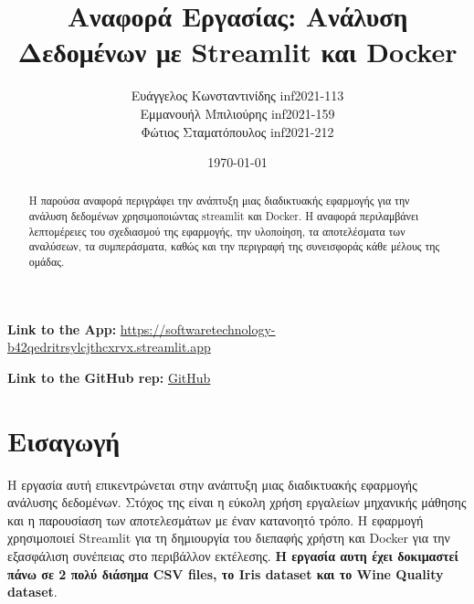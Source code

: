 \documentclass[a4paper,12pt]{article}
\title{Αναφορά Εργασίας: Ανάλυση Δεδομένων με \textlatin{Streamlit} και \textlatin{Docker}}
\author{Ευάγγελος Κωνσταντινίδης \textlatin{inf2021-113} \\
        Εμμανουήλ Μπιλιούρης \textlatin{inf2021-159} \\
        Φώτιος Σταματόπουλος \textlatin{inf2021-212}}
\date{\today}
\begin{document}

\maketitle

\begin{center}
    \textbf{\textlatin{Link to the App}:} \href{https://softwaretechnology-b42qedritrsylcjthcxrvx.streamlit.app}{\textlatin{https://softwaretechnology-b42qedritrsylcjthcxrvx.streamlit.app}}
\end{center}

\begin{center}
    \textbf{\textlatin{Link to the GitHub rep}:} \href{https://github.com/ManosBiliouris/Texnologia_Logismikou}{\textlatin{GitHub}}
\end{center}

\begin{abstract}
Η παρούσα αναφορά περιγράφει την ανάπτυξη μιας διαδικτυακής εφαρμογής για την ανάλυση δεδομένων χρησιμοποιώντας \textlatin{streamlit} και \textlatin{Docker}. Η αναφορά περιλαμβάνει λεπτομέρειες του σχεδιασμού της εφαρμογής, την υλοποίηση, τα αποτελέσματα των αναλύσεων, τα συμπεράσματα, καθώς και την περιγραφή της συνεισφοράς κάθε μέλους της ομάδας.
\end{abstract}

\tableofcontents
\newpage

\section{Εισαγωγή}
\label{sec:intro}
Η εργασία αυτή επικεντρώνεται στην ανάπτυξη μιας διαδικτυακής εφαρμογής ανάλυσης δεδομένων. Στόχος της είναι η εύκολη χρήση εργαλείων μηχανικής μάθησης και η παρουσίαση των αποτελεσμάτων με έναν κατανοητό τρόπο. Η εφαρμογή χρησιμοποιεί \textlatin{Streamlit} για τη δημιουργία του διεπαφής χρήστη και \textlatin{Docker} για την εξασφάλιση συνέπειας στο περιβάλλον εκτέλεσης. \textbf{Η εργασία αυτη έχει δοκιμαστεί πάνω σε 2 πολύ διάσημα \textlatin{CSV files}, το \textlatin{Iris dataset} και το \textlatin{Wine Quality dataset}}.
\end{document}
